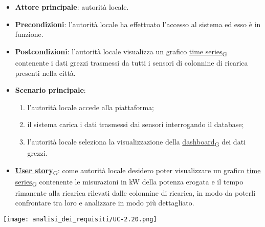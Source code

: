 \begin{itemize}
	\item \textbf{Attore principale}: autorità locale.
	\item \textbf{Precondizioni}: l'autorità locale ha effettuato l'accesso al sistema ed esso è in funzione.
	\item \textbf{Postcondizioni}: l'autorità locale visualizza un grafico \href{https://7last.github.io/docs/pb/documentazione-interna/glossario\#time-series}{time series\textsubscript{G}} contenente i dati grezzi trasmessi da tutti i sensori
	      di colonnine di ricarica presenti nella città.
	\item \textbf{Scenario principale}:
	      \begin{enumerate}
		      \item l'autorità locale accede alla piattaforma;
		      \item il sistema carica i dati trasmessi dai sensori interrogando il database;
		      \item l'autorità locale seleziona la visualizzazione della \href{https://7last.github.io/docs/pb/documentazione-interna/glossario\#dashboard}{dashboard\textsubscript{G}} dei dati grezzi.
	      \end{enumerate}
	\item \href{https://7last.github.io/docs/pb/documentazione-interna/glossario\#user-story}{\textbf{User story}\textsubscript{G}}:
	      come autorità locale desidero poter visualizzare un grafico \href{https://7last.github.io/docs/pb/documentazione-interna/glossario\#time-series}{time series\textsubscript{G}} contenente le misurazioni in kW della potenza erogata
	      e il tempo rimanente alla ricarica rilevati dalle colonnine di ricarica, in modo da poterli confrontare tra loro e analizzare in modo più dettagliato.
\end{itemize}
\begin{center}
	\texttt{[image: analisi\_dei\_requisiti/UC-2.20.png]}
\end{center}



